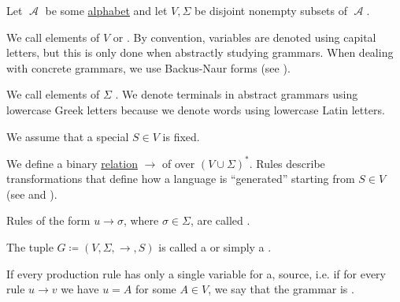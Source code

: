 \begin{definition}\label{def:grammar}
  Let \( \mscrA \) be some \hyperref[def:language/alphabet]{alphabet} and let \( V, \Sigma \) be disjoint nonempty subsets of \( \mscrA \).

  \begin{thmenum}
     We call elements of \( V \)  or . By convention, variables are denoted using capital letters, but this is only done when abstractly studying grammars. When dealing with concrete grammars, we use Backus-Naur forms (see ).

     We call elements of \( \Sigma \) . We denote terminals in abstract grammars using lowercase Greek letters because we denote words using lowercase Latin letters.

     We assume that a special  \( S \in V \) is fixed.

     We define a binary \hyperref[def:relation]{relation} \( \to \) of  over \( (V \cup \Sigma)^* \). Rules describe transformations that define how a language is \enquote{generated} starting from \( S \in V \) (see  and ).

     Rules of the form \( u \to \sigma \), where \( \sigma \in \Sigma \), are called .

     The tuple \( G \coloneqq (V, \Sigma, \to, S) \) is called a  or simply a .

     If every production rule has only a single variable for a, source, i.e. if for every rule \( u \to v \) we have \( u = A \) for some \( A \in V \), we say that the grammar is .
  \end{thmenum}
\end{definition}

